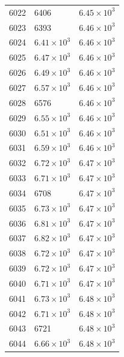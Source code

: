 \begin{table}[H]
\begin{tabular}{lll}
6022 & 6406 & $\displaystyle 6.45 \times 10^{3}$ \\
6023 & 6393 & $\displaystyle 6.46 \times 10^{3}$ \\
6024 & $\displaystyle 6.41 \times 10^{3}$ & $\displaystyle 6.46 \times 10^{3}$ \\
6025 & $\displaystyle 6.47 \times 10^{3}$ & $\displaystyle 6.46 \times 10^{3}$ \\
6026 & $\displaystyle 6.49 \times 10^{3}$ & $\displaystyle 6.46 \times 10^{3}$ \\
6027 & $\displaystyle 6.57 \times 10^{3}$ & $\displaystyle 6.46 \times 10^{3}$ \\
6028 & 6576 & $\displaystyle 6.46 \times 10^{3}$ \\
6029 & $\displaystyle 6.55 \times 10^{3}$ & $\displaystyle 6.46 \times 10^{3}$ \\
6030 & $\displaystyle 6.51 \times 10^{3}$ & $\displaystyle 6.46 \times 10^{3}$ \\
6031 & $\displaystyle 6.59 \times 10^{3}$ & $\displaystyle 6.46 \times 10^{3}$ \\
6032 & $\displaystyle 6.72 \times 10^{3}$ & $\displaystyle 6.47 \times 10^{3}$ \\
6033 & $\displaystyle 6.71 \times 10^{3}$ & $\displaystyle 6.47 \times 10^{3}$ \\
6034 & 6708 & $\displaystyle 6.47 \times 10^{3}$ \\
6035 & $\displaystyle 6.73 \times 10^{3}$ & $\displaystyle 6.47 \times 10^{3}$ \\
6036 & $\displaystyle 6.81 \times 10^{3}$ & $\displaystyle 6.47 \times 10^{3}$ \\
6037 & $\displaystyle 6.82 \times 10^{3}$ & $\displaystyle 6.47 \times 10^{3}$ \\
6038 & $\displaystyle 6.72 \times 10^{3}$ & $\displaystyle 6.47 \times 10^{3}$ \\
6039 & $\displaystyle 6.72 \times 10^{3}$ & $\displaystyle 6.47 \times 10^{3}$ \\
6040 & $\displaystyle 6.71 \times 10^{3}$ & $\displaystyle 6.47 \times 10^{3}$ \\
6041 & $\displaystyle 6.73 \times 10^{3}$ & $\displaystyle 6.48 \times 10^{3}$ \\
6042 & $\displaystyle 6.71 \times 10^{3}$ & $\displaystyle 6.48 \times 10^{3}$ \\
6043 & 6721 & $\displaystyle 6.48 \times 10^{3}$ \\
6044 & $\displaystyle 6.66 \times 10^{3}$ & $\displaystyle 6.48 \times 10^{3}$ \\

\end{tabular}
\end{table}
